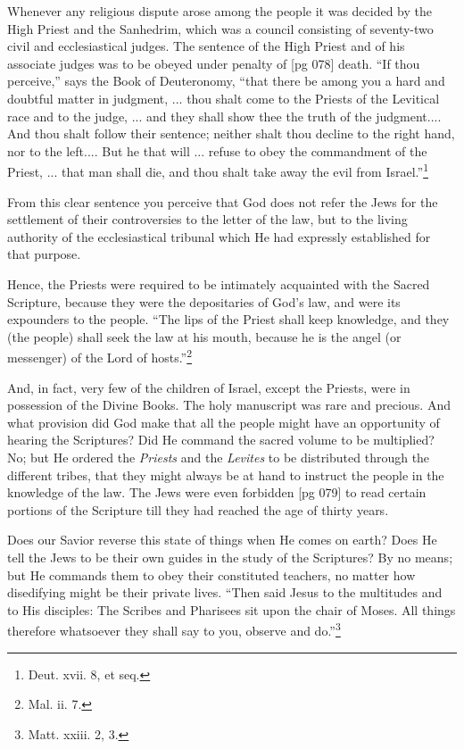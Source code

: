 Whenever any religious dispute arose among
the people it was decided by the High Priest and
the Sanhedrim, which was a council consisting
of seventy-two civil and ecclesiastical judges.
The sentence of the High Priest and of his associate
judges was to be obeyed under penalty of
[pg 078]
death. “If thou perceive,” says the Book of
Deuteronomy, “that there be among you a hard
and doubtful matter in judgment, ... thou shalt
come to the Priests of the Levitical race and to
the judge, ... and they shall show thee the truth
of the judgment.... And thou shalt follow their
sentence; neither shalt thou decline to the right
hand, nor to the left.... But he that will ...
refuse to obey the commandment of the Priest, ...
that man shall die, and thou shalt take away
the evil from Israel.”\footnote{Deut. xvii. 8, et seq.}

From this clear sentence you perceive that God
does not refer the Jews for the settlement of their
controversies to the letter of the law, but to the
living authority of the ecclesiastical tribunal
which He had expressly established for that purpose.

Hence, the Priests were required to be intimately
acquainted with the Sacred Scripture, because
they were the depositaries of God's law,
and were its expounders to the people. “The
lips of the Priest shall keep knowledge, and they
(the people) shall seek the law at his mouth, because
he is the angel (or messenger) of the Lord
of hosts.”\footnote{Mal. ii. 7.}

And, in fact, very few of the children of Israel,
except the Priests, were in possession of the Divine
Books. The holy manuscript was rare and
precious. And what provision did God make that
all the people might have an opportunity of hearing
the Scriptures? Did He command the sacred
volume to be multiplied? No; but He ordered
the \emph{Priests} and the \emph{Levites} to be distributed
through the different tribes, that they might always
be at hand to instruct the people in the
knowledge of the law. The Jews were even forbidden
[pg 079]
to read certain portions of the Scripture
till they had reached the age of thirty years.

Does our Savior reverse this state of things
when He comes on earth? Does He tell the Jews
to be their own guides in the study of the Scriptures?
By no means; but He commands them to
obey their constituted teachers, no matter how
disedifying might be their private lives. “Then
said Jesus to the multitudes and to His disciples:
The Scribes and Pharisees sit upon the chair of
Moses. All things therefore whatsoever they
shall say to you, observe and do.”\footnote{Matt. xxiii. 2, 3.}

